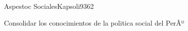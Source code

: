 \begin{syllabus}
\begin{unit}{Aspestoc Sociales}{Kapsoli93}{6}{2}
\begin{unitgoals}
      \item Consolidar los conocimientos de la politica social del PerÃº
\end{unitgoals}
\end{unit}



\begin{coursebibliography}
\end{coursebibliography}

\end{syllabus}
